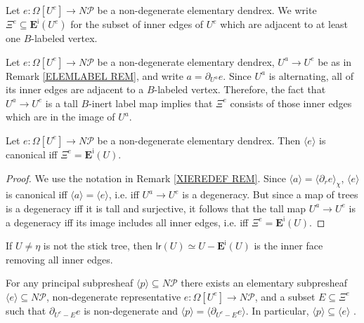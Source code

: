 \documentclass[a4paper,10pt
,draft
]{article}%
\renewcommand{\1}{\eta}%
\begin{document}
\begin{definition}\label{XIEDGES DEF}
Let $e \colon \Omega[U^e] \to N \mathcal{P}$ be a  non-degenerate elementary dendrex. 
We write
$\Xi^e \subseteq \boldsymbol{E}^{\mathsf{i}}(U^e)$
for the subset of inner edges of $U^e$ which are adjacent to at least one $B$-labeled vertex.
\end{definition}




\begin{remark}\label{XIEREDEF REM}
Let $e \colon \Omega[U^e] \to N \mathcal{P}$ be a  non-degenerate elementary dendrex, 
$U^a \to U^e$ be as in Remark \ref{ELEMLABEL REM}, 
and write $a = \partial_{U^a} e$.
Since $U^a$ is alternating, all of its inner edges are adjacent to a 
$B$-labeled vertex. 
Therefore, the fact that $U^a \to U^e$ is a tall $B$-inert label map
implies that $\Xi^e$ consists of those inner edges which are in the image of $U^a$.
\end{remark}



\begin{proposition}\label{CANIFFXIE PROP}
Let $e \colon \Omega[U^e] \to N \mathcal{P}$ be a  non-degenerate elementary dendrex.
%
Then $\langle e \rangle$
is canonical iff $\Xi^e = \boldsymbol{E}^{\mathsf{i}}(U)$.
\end{proposition}

\begin{proof}
We use the notation in Remark \ref{XIEREDEF REM}.
Since $\langle a\rangle = \langle \partial_r e \rangle_{\chi}$, 
$\langle e \rangle$
is canonical 
iff
 $\langle a\rangle = \langle e \rangle$, i.e.
iff
$U^a \to U^e$ is a degeneracy. 
But since a map of trees is a degeneracy iff it is tall and surjective,
it follows that the tall map $U^a \to U^e$ is a degeneracy
iff its image includes all inner edges, i.e. iff $\Xi^e = \boldsymbol{E}^{\mathsf{i}}(U)$.
\end{proof}



\begin{remark}\label{WHENLRINN REM}
If $U\neq \eta$ is not the stick tree,
then $\mathsf{lr}(U) \simeq U - \boldsymbol{E}^{\mathsf{i}}(U)$
is the inner face removing all inner edges.
\end{remark}



\begin{lemma}\label{ELEMEXIST LEM}
For any principal subpresheaf $\langle p \rangle \subseteq N \mathcal{P}$
there exists an elementary subpresheaf
$\langle e \rangle \subseteq N \mathcal P$, 
non-degenerate representative 
$e \colon \Omega[U^e] \to N \mathcal{P}$,
and a subset $E \subseteq \Xi^{e}$
such that
 $\partial_{U^e-E} e$ is non-degenerate and 
$\langle p \rangle = \langle \partial_{U^e-E} e \rangle$.
In particular,  
$\langle p \rangle \subseteq \langle e \rangle$ .
\end{lemma}
\end{document}
